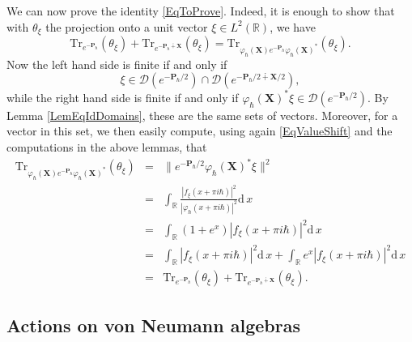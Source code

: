 \documentclass[11pt, reqno]{amsart}
\theoremstyle{definition}
\numberwithin{equation}{section}
\def\msD{\mathscr D}
\def\R{\mathbb R}
\newcommand{\Pb}{\mathbf{P}}
\newcommand{\Xb}{\mathbf{X}}
\newcommand{\rd}{\mathrm{d}\!\,}
\newcommand{\Tr}{\mathrm{Tr}}
\begin{document}
We can now prove  the identity \eqref{EqToProve}. Indeed, it is enough to show that with $\theta_{\xi}$ the projection onto a unit vector $\xi\in L^2(\R)$, we have
\begin{equation}\label{EqFormSumComp}
\Tr_{e^{-\Pb_{\hbar}}}(\theta_{\xi}) + \Tr_{e^{-\Pb_{\hbar}\dotplus \Xb}}(\theta_{\xi}) = \Tr_{\varphi_{\hbar}(\Xb) e^{-\Pb_{\hbar}}\varphi_{\hbar}(\Xb)^*}(\theta_{\xi}). 
\end{equation}
Now the left hand side is finite if and only if 
\begin{equation}\label{EqDomainInt}
\xi \in \msD(e^{-\Pb_{\hbar}/2}) \cap \msD(e^{-\Pb_{\hbar}/2\dotplus \Xb/2}),
\end{equation}
while the right hand side is finite if and only if $\varphi_{\hbar}(\Xb)^*\xi\in \msD(e^{-\Pb_{\hbar}/2})$. By Lemma \ref{LemEqIdDomains}, these are the same sets of vectors. Moreover, for a vector in this set, we then easily compute, using again \eqref{EqValueShift} and the computations in the above lemmas, that
\begin{eqnarray*}
\Tr_{\varphi_{\hbar}(\Xb) e^{-\Pb_{\hbar}}\varphi_{\hbar}(\Xb)^*}(\theta_{\xi}) &=& \| e^{-\Pb_{\hbar}/2} \varphi_{\hbar}(\Xb)^*\xi\|^2\\
&=& \int_{\R}\frac{|f_{\xi}(x+\pi i \hbar)|^2}{|\varphi_{\hbar}(x+\pi i \hbar)|^2} \rd x\\
&=& \int_{\R}(1+ e^{x}) |f_{\xi}(x+\pi i \hbar)|^2 \rd x\\
&=& \int_{\R} |f_{\xi}(x+\pi i\hbar)|^2 \rd x+  \int_{\R} e^{x} |f_{\xi}(x+\pi i \hbar)|^2 \rd x\\ 
&=& \Tr_{e^{-\Pb_{\hbar}}}(\theta_{\xi}) + \Tr_{e^{-\Pb_{\hbar}\dotplus \Xb}}(\theta_{\xi}).
\end{eqnarray*} 







\subsection{Actions on von Neumann algebras}
\end{document}
